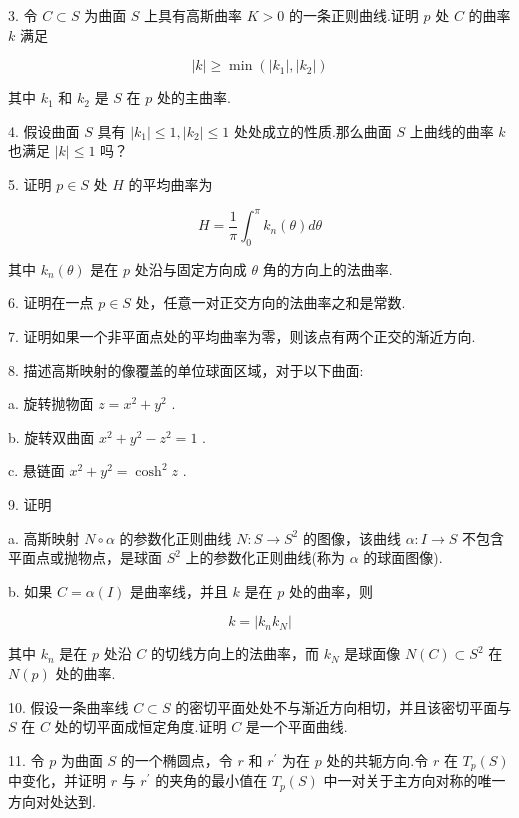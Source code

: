 3. 令 \(C \subset  S\) 为曲面 \(S\) 上具有高斯曲率 \(K > 0\) 的一条正则曲线.证明 \(p\) 处 \(C\) 的曲率 \(k\) 满足

\[
\left| k\right|  \geq  \min \left( {\left| {k}_{1}\right| ,\left| {k}_{2}\right| }\right)
\]

其中 \({k}_{1}\) 和 \({k}_{2}\) 是 \(S\) 在 \(p\) 处的主曲率.

4. 假设曲面 \(S\) 具有 \(\left| {k}_{1}\right|  \leq  1,\left| {k}_{2}\right|  \leq  1\) 处处成立的性质.那么曲面 \(S\) 上曲线的曲率 \(k\) 也满足 \(\left| k\right|  \leq  1\) 吗？

5. 证明 \(p \in  S\) 处 \(H\) 的平均曲率为

\[
H = \frac{1}{\pi }{\int }_{0}^{\pi }{k}_{n}\left( \theta \right) {d\theta }
\]

其中 \({k}_{n}\left( \theta \right)\) 是在 \(p\) 处沿与固定方向成 \(\theta\) 角的方向上的法曲率.

6. 证明在一点 \(p \in  S\) 处，任意一对正交方向的法曲率之和是常数.

7. 证明如果一个非平面点处的平均曲率为零，则该点有两个正交的渐近方向.

8. 描述高斯映射的像覆盖的单位球面区域，对于以下曲面:

a. 旋转抛物面 \(z = {x}^{2} + {y}^{2}\) .

b. 旋转双曲面 \({x}^{2} + {y}^{2} - {z}^{2} = 1\) .

c. 悬链面 \({x}^{2} + {y}^{2} = {\cosh }^{2}z\) .

9. 证明

a. 高斯映射 \(N \circ  \alpha\) 的参数化正则曲线 \(N : S \rightarrow  {S}^{2}\) 的图像，该曲线 \(\alpha  : I \rightarrow  S\) 不包含平面点或抛物点，是球面 \({S}^{2}\) 上的参数化正则曲线(称为 \(\alpha\) 的球面图像).

b. 如果 \(C = \alpha \left( I\right)\) 是曲率线，并且 \(k\) 是在 \(p\) 处的曲率，则

\[
k = \left| {{k}_{n}{k}_{N}}\right|
\]

其中 \({k}_{n}\) 是在 \(p\) 处沿 \(C\) 的切线方向上的法曲率，而 \({k}_{N}\) 是球面像 \(N\left( C\right)  \subset  {S}^{2}\) 在 \(N\left( p\right)\) 处的曲率.

10. 假设一条曲率线 \(C \subset  S\) 的密切平面处处不与渐近方向相切，并且该密切平面与 \(S\) 在 \(C\) 处的切平面成恒定角度.证明 \(C\) 是一个平面曲线.

11. 令 \(p\) 为曲面 \(S\) 的一个椭圆点，令 \(r\) 和 \({r}^{\prime }\) 为在 \(p\) 处的共轭方向.令 \(r\) 在 \({T}_{p}\left( S\right)\) 中变化，并证明 \(r\) 与 \({r}^{\prime }\) 的夹角的最小值在 \({T}_{p}\left( S\right)\) 中一对关于主方向对称的唯一方向对处达到.

